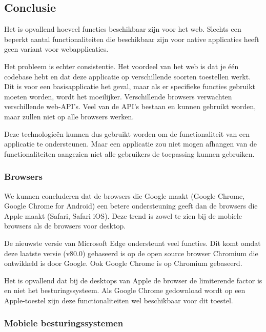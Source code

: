 	\clearpage
	\subsection{Conclusie}
	
		Het is opvallend hoeveel functies beschikbaar zijn voor het web. Slechts een beperkt aantal functionaliteiten die beschikbaar zijn voor native applicaties heeft geen variant voor webapplicaties.
		
		Het probleem is echter consistentie. Het voordeel van het web is dat je één codebase hebt en dat deze applicatie op verschillende soorten toestellen werkt. Dit is voor een basisapplicatie het geval, maar als er specifieke functies gebruikt moeten worden, wordt het moeilijker. Verschillende browsers verwachten verschillende web-API's. Veel van de API's bestaan en kunnen gebruikt worden, maar zullen niet op alle browsers werken.
		
		Deze technologieën kunnen dus gebruikt worden om de functionaliteit van een applicatie te ondersteunen. Maar een applicatie zou niet mogen afhangen van de functionaliteiten aangezien niet alle gebruikers de toepassing kunnen gebruiken.
		
	
	
	\subsubsection{Browsers}
	
		We kunnen concluderen dat de browsers die Google maakt (Google Chrome, Google Chrome for Android) een betere ondersteuning geeft dan de browsers die Apple maakt (Safari, Safari iOS). Deze trend is zowel te zien bij de mobiele browsers als de browsers voor desktop.
		
		De nieuwste versie van Microsoft Edge ondersteunt veel functies. Dit komt omdat deze laatste versie (v80.0) gebaseerd is op de open source browser Chromium die ontwikkeld is door Google. Ook Google Chrome is op Chromium gebaseerd.
		
		Het is opvallend dat bij de desktops van Apple de browser de limiterende factor is en niet het besturingssysteem. Als Google Chrome gedownload wordt op een Apple-toestel zijn deze functionaliteiten wel beschikbaar voor dit toestel.
		
		
	
	\subsubsection{Mobiele besturingssystemen }
	
